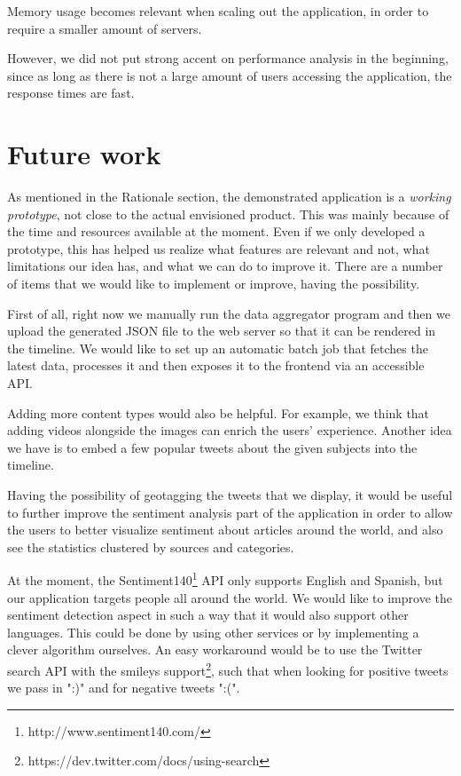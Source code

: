 \documentclass{acm_proc_10ptArticle-sp}
\begin{document}
Memory usage becomes relevant when scaling out the application, in order to require a smaller amount of servers.

However, we did not put strong accent on performance analysis in the beginning, since as long as there is not a large amount of users accessing the application, the response times are fast.

\section{Future work}

As mentioned in the Rationale section, the demonstrated application is a \textit{working prototype}, not close to the actual envisioned product. This was mainly because of the time and resources available at the moment. Even if we only developed a prototype, this has helped us realize what features are relevant and not, what limitations our idea has, and what we can do to improve it. There are a number of items that we would like to implement or improve, having the possibility.

First of all, right now we manually run the data aggregator program and then we upload the generated JSON file to the web server so that it can be rendered in the timeline. We would like to set up an automatic batch job that fetches the latest data, processes it and then exposes it to the frontend via an accessible API.

Adding more content types would also be helpful. For example, we think that adding videos alongside the images can enrich the users' experience. Another idea we have is to embed a few popular tweets about the given subjects into the timeline.

Having the possibility of geotagging the tweets that we display, it would be useful to further improve the sentiment analysis part of the application in order to allow the users to better visualize sentiment about articles around the world, and also see the statistics clustered by sources and categories.

At the moment, the Sentiment140\footnote{http://www.sentiment140.com/} API only supports English and Spanish, but our application targets people all around the world. We would like to improve the sentiment detection aspect in such a way that it would also support other languages. This could be done by using other services or by implementing a clever algorithm ourselves. An easy workaround would be to use the Twitter search API with the smileys support\footnote{https://dev.twitter.com/docs/using-search}, such that when looking for positive tweets we pass in ":)" and for negative tweets ":(".
\end{document}

